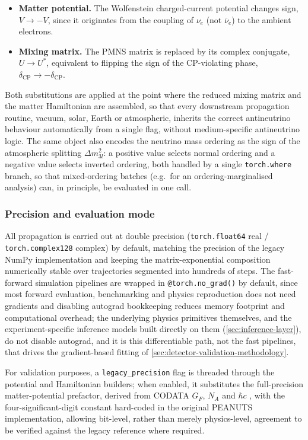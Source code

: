 \begin{itemize}
  \item \textbf{Matter potential.} The Wolfenstein charged-current potential changes sign, \(V\to-V\), since it originates from the coupling of \(\nu_e\) (not \(\bar\nu_e\)) to the ambient electrons.
  \item \textbf{Mixing matrix.} The PMNS matrix is replaced by its complex conjugate, \(U\to U^{*}\), equivalent to flipping the sign of the CP-violating phase, \(\delta_{\mathrm{CP}}\to-\delta_{\mathrm{CP}}\).
\end{itemize}

Both substitutions are applied at the point where the reduced mixing matrix and the matter Hamiltonian are assembled, so that every downstream propagation routine, vacuum, solar, Earth or atmospheric, inherits the correct antineutrino behaviour automatically from a single flag, without medium-specific antineutrino logic. The same object also encodes the neutrino mass ordering as the sign of the atmospheric splitting \(\Delta m^2_{3l}\): a positive value selects normal ordering and a negative value selects inverted ordering, both handled by a single \texttt{torch.where} branch, so that mixed-ordering batches (e.g.\ for an ordering-marginalised analysis) can, in principle, be evaluated in one call.

\subsubsection{Precision and evaluation mode}
\label{sec:precision-modes}

All propagation is carried out at double precision (\texttt{torch.float64} real / \texttt{torch.complex128} complex) by default, matching the precision of the legacy NumPy implementation and keeping the matrix-exponential composition numerically stable over trajectories segmented into hundreds of steps. The fast-forward simulation pipelines are wrapped in \texttt{@torch.no\_grad()} by default, since most forward evaluation, benchmarking and physics reproduction does not need gradients and disabling autograd bookkeeping reduces memory footprint and computational overhead; the underlying physics primitives themselves, and the experiment-specific inference models built directly on them (\cref{sec:inference-layer}), do not disable autograd, and it is this differentiable path, not the fast pipelines, that drives the gradient-based fitting of \cref{sec:detector-validation-methodology}.

For validation purposes, a \texttt{legacy\_precision} flag is threaded through the potential and Hamiltonian builders; when enabled, it substitutes the full-precision matter-potential prefactor, derived from CODATA \(G_F\), \(N_A\) and \(\hbar c\) \parencite{CODATA2021}, with the four-significant-digit constant hard-coded in the original PEANUTS implementation, allowing bit-level, rather than merely physics-level, agreement to be verified against the legacy reference where required.

